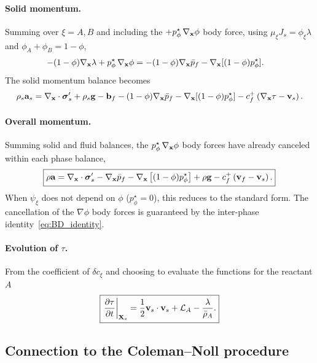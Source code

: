 \documentclass[11pt]{article}
\begin{document}
\paragraph{Solid momentum.}  Summing over $\xi = A, B$ and including the $+p^\star_\phi\,\nabla_{\mathbf{x}}\phi$ body force, using $\mu_\xi J_s = \phi_\xi\lambda$ and $\phi_A + \phi_B = 1-\phi$,
\begin{align*}
  -(1-\phi)\nabla_{\mathbf{x}}\lambda + p^\star_\phi\,\nabla_{\mathbf{x}}\phi
  &= -(1-\phi)\nabla_{\mathbf{x}}\bar{p}_f - \nabla_{\mathbf{x}}[(1-\phi)p^\star_\phi].
\end{align*}
The solid momentum balance becomes
\begin{equation*}
  \rho_s\mathbf{a}_s = \nabla_{\mathbf{x}}\cdot \boldsymbol{\sigma}'_s + \rho_s\mathbf{g} - \mathbf{b}_f - (1-\phi)\nabla_{\mathbf{x}}\bar{p}_f - \nabla_{\mathbf{x}}[(1-\phi)p^\star_\phi] - c^+_f\left(\nabla_{\mathbf{x}}\tau - \mathbf{v}_s\right).
\end{equation*}

\paragraph{Overall momentum.}  Summing solid and fluid balances, the $p^\star_\phi\,\nabla_{\mathbf{x}}\phi$ body forces have already canceled within each phase balance,
\begin{equation}
  \boxed{\rho\mathbf{a} = \nabla_{\mathbf{x}}\cdot \boldsymbol{\sigma}'_s - \nabla_{\mathbf{x}}\bar{p}_f - \nabla_{\mathbf{x}}\left[(1-\phi)p^\star_\phi\right] + \rho\mathbf{g} - c^+_f\left(\mathbf{v}_f - \mathbf{v}_s\right).}
  \label{eq:var_mom_overall}
\end{equation}
When $\psi_\xi$ does not depend on $\phi$ ($p^\star_\phi = 0$), this reduces to the standard form.  The cancellation of the $\nabla\phi$ body forces is guaranteed by the inter-phase identity~\eqref{eq:BD_identity}.

\paragraph{Evolution of $\tau$.}  From the coefficient of $\delta c_\xi$ and choosing to evaluate the functions for the reactant $A$
%
\begin{equation}
  \boxed{\left.\frac{\partial \tau}{\partial t}\right|_{\mathbf{X}_s} = \frac{1}{2}\mathbf{v}_s\cdot\mathbf{v}_s + \mathcal{L}_A - \frac{\lambda}{\bar\rho_A}.}
  \label{eq:var_tau_final}
\end{equation}

\subsection{Connection to the Coleman--Noll procedure}
\label{sec:coleman_connection}
\end{document}
